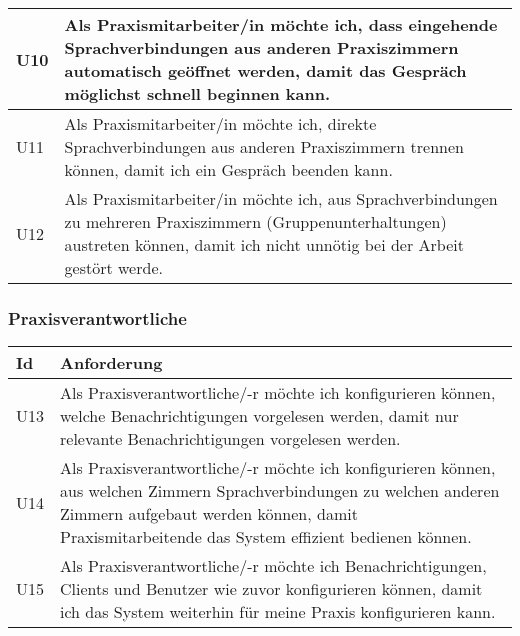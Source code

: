 \begin{table}[h]
\begin{tabular}{|l|p{15cm}|}
        \hline
        U10 & Als Praxismitarbeiter/in möchte ich, dass eingehende Sprachverbindungen aus anderen Praxiszimmern automatisch geöffnet werden, damit das Gespräch möglichst schnell beginnen kann.        \\
        \hline
        U11 & Als Praxismitarbeiter/in möchte ich, direkte Sprachverbindungen aus anderen Praxiszimmern trennen können, damit ich ein Gespräch beenden kann.                                          \\
        \hline
        U12 & Als Praxismitarbeiter/in möchte ich, aus Sprachverbindungen zu mehreren Praxiszimmern (Gruppenunterhaltungen) austreten können, damit ich nicht unnötig bei der Arbeit gestört werde.  \\
        \hline
    \end{tabular}\label{tab:userstories0}
\end{table}

\clearpage

\subsubsection{Praxisverantwortliche}

\begin{table}[h]
    \centering
    \begin{tabular}{|l|p{15cm}|}
        \hline
        \textbf{Id} & \textbf{Anforderung}                                                                                                                                                                                                    \\
        \hline
        U13         & Als Praxisverantwortliche/-r möchte ich konfigurieren können, welche Benachrichtigungen vorgelesen werden, damit nur relevante Benachrichtigungen vorgelesen werden.                       \\
        \hline
        U14         & Als Praxisverantwortliche/-r möchte ich konfigurieren können, aus welchen Zimmern Sprachverbindungen zu welchen anderen Zimmern aufgebaut werden können, damit Praxismitarbeitende das System effizient bedienen können.     \\
        \hline
        U15         & Als Praxisverantwortliche/-r möchte ich Benachrichtigungen, Clients und Benutzer wie zuvor konfigurieren können, damit ich das System weiterhin für meine Praxis konfigurieren kann. \\
        \hline
    \end{tabular}\label{tab:userstories2}
\end{table}

